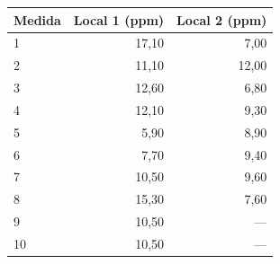 \begin{tabular}{lrr}
\toprule
Medida & Local 1 (ppm) & Local 2 (ppm) \\
\midrule
1 & 17,10 & 7,00 \\
2 & 11,10 & 12,00 \\
3 & 12,60 & 6,80 \\
4 & 12,10 & 9,30 \\
5 & 5,90 & 8,90 \\
6 & 7,70 & 9,40 \\
7 & 10,50 & 9,60 \\
8 & 15,30 & 7,60 \\
9 & 10,50 & — \\
10 & 10,50 & — \\
\bottomrule
\end{tabular}
